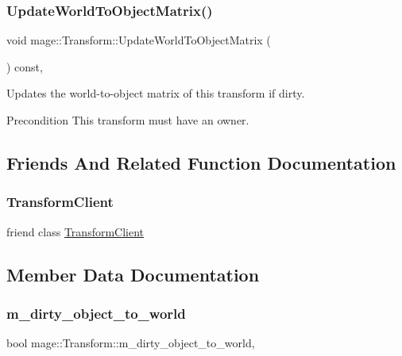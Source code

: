 \subsubsection{\texorpdfstring{Update\+World\+To\+Object\+Matrix()}{UpdateWorldToObjectMatrix()}}
{\footnotesize\ttfamily void mage\+::\+Transform\+::\+Update\+World\+To\+Object\+Matrix (\begin{DoxyParamCaption}{ }\end{DoxyParamCaption}) const\hspace{0.3cm}{\ttfamily [private]}, {\ttfamily [noexcept]}}

Updates the world-\/to-\/object matrix of this transform if dirty.

\begin{DoxyPrecond}{Precondition}
This transform must have an owner. 
\end{DoxyPrecond}


\subsection{Friends And Related Function Documentation}
\hypertarget{classmage_1_1_transform_af7bc9408e1e31d66cb7fd971ff437a3a}{}\label{classmage_1_1_transform_af7bc9408e1e31d66cb7fd971ff437a3a} 
\subsubsection{\texorpdfstring{Transform\+Client}{TransformClient}}
{\footnotesize\ttfamily friend class \hyperlink{classmage_1_1_transform_client}{Transform\+Client}\hspace{0.3cm}{\ttfamily [friend]}}



\subsection{Member Data Documentation}
\hypertarget{classmage_1_1_transform_a37b39fe67eaf4dc64d4b2c87b8868c4e}{}\label{classmage_1_1_transform_a37b39fe67eaf4dc64d4b2c87b8868c4e} 
\subsubsection{\texorpdfstring{m\+\_\+dirty\+\_\+object\+\_\+to\+\_\+world}{m\_dirty\_object\_to\_world}}
{\footnotesize\ttfamily bool mage\+::\+Transform\+::m\+\_\+dirty\+\_\+object\+\_\+to\+\_\+world\hspace{0.3cm}{\ttfamily [mutable]}, {\ttfamily [private]}}

